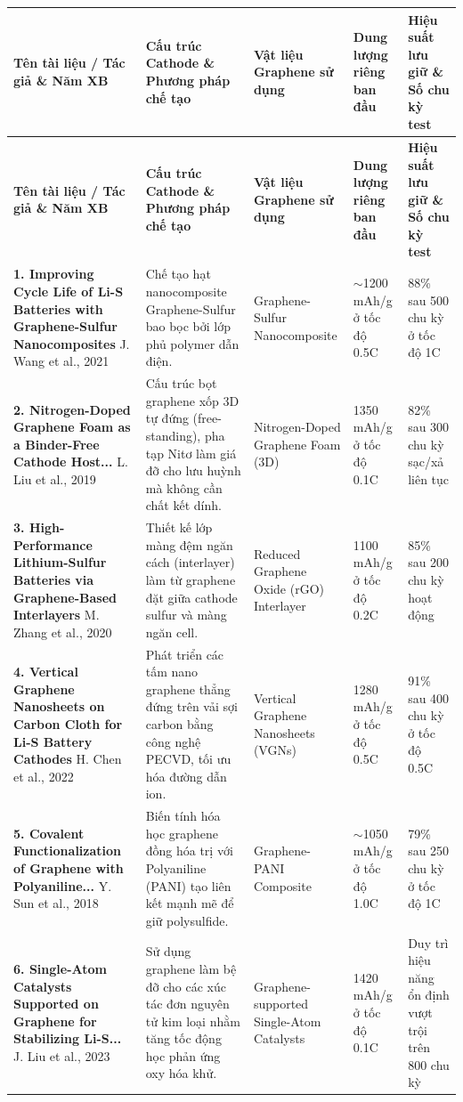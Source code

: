 \documentclass[12pt,a4paper]{article}
\begin{document}
\begin{longtable}{|p{4.5cm}|p{3.2cm}|p{2.8cm}|p{2.8cm}|p{2.5cm}|}
\hline
\textbf{Tên tài liệu / Tác giả \& Năm XB} & \textbf{Cấu trúc Cathode \& Phương pháp chế tạo} & \textbf{Vật liệu Graphene sử dụng} & \textbf{Dung lượng riêng ban đầu} & \textbf{Hiệu suất lưu giữ \& Số chu kỳ test} \\
\hline
\endfirsthead
\hline
\textbf{Tên tài liệu / Tác giả \& Năm XB} & \textbf{Cấu trúc Cathode \& Phương pháp chế tạo} & \textbf{Vật liệu Graphene sử dụng} & \textbf{Dung lượng riêng ban đầu} & \textbf{Hiệu suất lưu giữ \& Số chu kỳ test} \\
\hline
\endhead
\hline
\endfoot
\hline
\endlastfoot

\textbf{1. Improving Cycle Life of Li-S Batteries with Graphene-Sulfur Nanocomposites} \newline J. Wang et al., 2021 & Chế tạo hạt nanocomposite Graphene-Sulfur bao bọc bởi lớp phủ polymer dẫn điện. & Graphene-Sulfur Nanocomposite & $\sim$1200 mAh/g ở tốc độ 0.5C & 88\% sau 500 chu kỳ ở tốc độ 1C \\
\hline
\textbf{2. Nitrogen-Doped Graphene Foam as a Binder-Free Cathode Host...} \newline L. Liu et al., 2019 & Cấu trúc bọt graphene xốp 3D tự đứng (free-standing), pha tạp Nitơ làm giá đỡ cho lưu huỳnh mà không cần chất kết dính. & Nitrogen-Doped Graphene Foam (3D) & 1350 mAh/g ở tốc độ 0.1C & 82\% sau 300 chu kỳ sạc/xả liên tục \\
\hline
\textbf{3. High-Performance Lithium-Sulfur Batteries via Graphene-Based Interlayers} \newline M. Zhang et al., 2020 & Thiết kế lớp màng đệm ngăn cách (interlayer) làm từ graphene đặt giữa cathode sulfur và màng ngăn cell. & Reduced Graphene Oxide (rGO) Interlayer & 1100 mAh/g ở tốc độ 0.2C & 85\% sau 200 chu kỳ hoạt động \\
\hline
\textbf{4. Vertical Graphene Nanosheets on Carbon Cloth for Li-S Battery Cathodes} \newline H. Chen et al., 2022 & Phát triển các tấm nano graphene thẳng đứng trên vải sợi carbon bằng công nghệ PECVD, tối ưu hóa đường dẫn ion. & Vertical Graphene Nanosheets (VGNs) & 1280 mAh/g ở tốc độ 0.5C & 91\% sau 400 chu kỳ ở tốc độ 0.5C \\
\hline
\textbf{5. Covalent Functionalization of Graphene with Polyaniline...} \newline Y. Sun et al., 2018 & Biến tính hóa học graphene đồng hóa trị với Polyaniline (PANI) tạo liên kết mạnh mẽ để giữ polysulfide. & Graphene-PANI Composite & $\sim$1050 mAh/g ở tốc độ 1.0C & 79\% sau 250 chu kỳ ở tốc độ 1C \\
\hline
\textbf{6. Single-Atom Catalysts Supported on Graphene for Stabilizing Li-S...} \newline J. Liu et al., 2023 & Sử dụng graphene làm bệ đỡ cho các xúc tác đơn nguyên tử kim loại nhằm tăng tốc động học phản ứng oxy hóa khử. & Graphene-supported Single-Atom Catalysts & 1420 mAh/g ở tốc độ 0.1C & Duy trì hiệu năng ổn định vượt trội trên 800 chu kỳ \\
\hline
\end{longtable}
\end{document}
